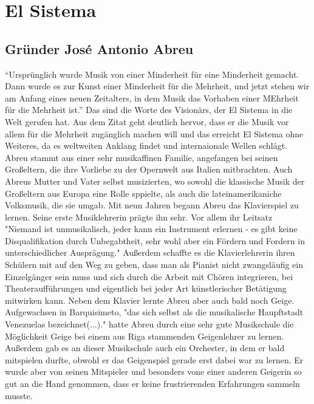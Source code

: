 \section{El Sistema}

\subsection{Gründer José Antonio Abreu}
\enquote{Ursprünglich wurde Musik von einer Minderheit für eine Minderheit gemacht. Dann
wurde es zur Kunst einer Minderheit für die Mehrheit, und jetzt stehen wir am
Anfang eines neuen Zeitalters, in dem Musik das Vorhaben einer MEhrheit für die
Mehrheit ist.} \autocite[5]{kaufmann:el_sistema}
Das sind die Worte des Visionärs, der El Sistema in die Welt gerufen hat. Aus
dem Zitat geht deutlich hervor, dass er die Musik vor allem für die Mehrheit
zugänglich machen will und das erreicht El Sistema ohne Weiteres, da es
weltweiten Anklang findet und internaionale Wellen schlägt.
Abreu stammt aus einer sehr musikaffinen Familie, angefangen bei seinen
Großeltern, die ihre Vorliebe zu der Opernwelt aus Italien mitbrachten. Auch
Abreus Mutter und Vater selbst musizierten, wo sowohl die klassische Musik der
Großeltern aus Europa eine Rolle sppielte, als auch die lateinamerikaniche
Volksmusik, die sie umgab. Mit neun Jahren begann Abreu das Klavierspiel zu
lernen. Seine erste Musiklehrerin prägte ihn sehr. Vor allem ihr Leitsatz
"Niemand ist unmusikalisch, jeder kann ein Instrument erlernen - es gibt keine
Disqualifikation durch Unbegabtheit, sehr wohl aber ein Fördern und Fordern in
unterschiedlicher Ausprägung." \autocite[20]{kaufmann:el_sistema} Außerdem
schaffte es die Klavierlehrerin ihren Schülern mit auf den Weg zu geben, dass
man als Pianist nicht zwangsläufig ein Einzelgänger sein muss und sich durch die
Arbeit mit Chören integrieren, bei Theateraufführungen und eigentlich bei jeder
Art künstlerischer Betätigung mitwirken kann. Neben dem
Klavier lernte Abreu aber auch bald noch Geige.
Aufgewachsen in Barquisimeto, "das sich selbst als die musikalische Haupftstadt
Venezuelas bezeichnet(...)." \autocite[22]{kaufmann:el_sistema} hatte Abreu
durch eine sehr gute Musikschule die Möglichkeit Geige bei einem aus Riga
stammenden Geigenlehrer zu lernen. Außerdem gab es an dieser Musikschule auch
ein Orchester, in dem er bald mitspielen durfte, obwohl er das Geigenspiel
gerade erst dabei war zu lernen. Er wurde aber von seinen Mitspieler und
besonders vone einer anderen Geigerin so gut an
die Hand genommen, dass er keine frustrierenden Erfahrungen sammeln musste.
